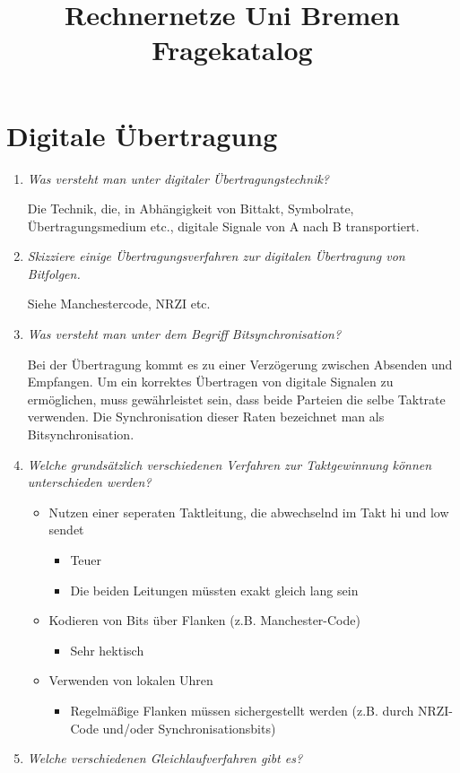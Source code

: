 \documentclass[hidelinks]{article}
\title{Rechnernetze Uni Bremen Fragekatalog}
\begin{document}
\maketitle
\section{Digitale Übertragung}
\begin{enumerate}
\item \textit{Was versteht man unter digitaler Übertragungstechnik?}

Die Technik, die, in Abhängigkeit von Bittakt, Symbolrate, Übertragungsmedium etc., digitale Signale von A nach B transportiert. %

\item \textit{Skizziere einige Übertragungsverfahren zur digitalen Übertragung von Bitfolgen.}

Siehe Manchestercode, NRZI etc. %
\item \textit{Was versteht man unter dem Begriff Bitsynchronisation?}

Bei der Übertragung kommt es zu einer Verzögerung zwischen Absenden und Empfangen. Um ein korrektes Übertragen von digitale Signalen zu ermöglichen, muss gewährleistet sein, dass beide Parteien die selbe Taktrate verwenden. Die Synchronisation dieser Raten bezeichnet man als Bitsynchronisation.
\item \textit{Welche grundsätzlich verschiedenen Verfahren zur Taktgewinnung können unterschieden werden?}

\begin{itemize}
	\item Nutzen einer seperaten Taktleitung, die abwechselnd im Takt hi und low sendet 
	\begin{itemize}
		\item Teuer
		\item Die beiden Leitungen müssten exakt gleich lang sein
	\end{itemize}
	\item Kodieren von Bits über Flanken (z.B. Manchester-Code)
	\begin{itemize}
		\item Sehr hektisch
	\end{itemize}
	\item Verwenden von lokalen Uhren
	\begin{itemize}
		\item Regelmäßige Flanken müssen sichergestellt werden (z.B. durch NRZI-Code und/oder Synchronisationsbits)
	\end{itemize}
\end{itemize}
\item \textit{Welche verschiedenen Gleichlaufverfahren gibt es?}


\end{enumerate}
\end{document}
